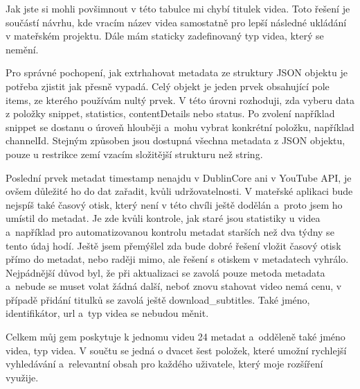 \par Jak jste si mohli povšimnout v této tabulce mi chybí titulek videa. Toto řešení je součástí návrhu, kde vracím název videa samostatně pro lepší následné ukládání v mateřském projektu. Dále mám staticky zadefinovaný typ videa, který se nemění. 
\par Pro správné pochopení, jak extrhahovat metadata ze struktury JSON objektu je potřeba zjistit jak přesně vypadá. Celý objekt je jeden prvek obsahující pole items, ze kterého používám nultý prvek. V této úrovni rozhoduji, zda vyberu data z položky snippet, statistics, contentDetails nebo status. Po zvolení například snippet se dostanu o úroveň hlouběji a~mohu vybrat konkrétní položku, například channelId. Stejným způsoben jsou dostupná všechna metadata z JSON objektu, pouze u restrikce zemí vzacím složitější strukturu než string.
\par Poslední prvek metadat timestamp nenajdu v DublinCore ani v YouTube API, je ovšem důležité ho do dat zařadit, kvůli udržovatelnosti. V mateřské aplikaci bude nejspíš také časový otisk, který není v této chvíli ještě dodělán a~proto jsem ho umístil do metadat. Je zde kvůli kontrole, jak staré jsou statistiky u videa a~například pro automatizovanou kontrolu metadat starších než dva týdny se tento údaj hodí. Ještě jsem přemýšlel zda bude dobré řešení vložit časový otisk přímo do metadat, nebo raději mimo, ale řešení s otiskem v metadatech vyhrálo. Nejpádnější důvod byl, že při aktualizaci se zavolá pouze metoda metadata a~nebude se muset volat žádná další, neboť znovu stahovat video nemá cenu, v případě přidání titulků se zavolá ještě download\_subtitles. Také jméno, identifikátor, url a~typ videa se nebudou měnit.
\par Celkem můj gem poskytuje k jednomu videu 24 metadat a~odděleně také jméno videa, typ videa. V součtu se jedná o dvacet šest položek, které umožní rychlejší vyhledávání a~relevantní obsah pro každého uživatele, který moje rozšíření využije.

